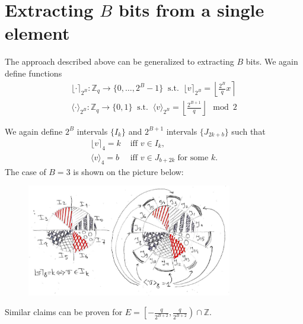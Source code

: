 \documentclass[12pt]{article}
\newcommand{\Z}{\mathbb{Z}}
\begin{document}
\section{Extracting $B$ bits from a single element}
\label{sec:Bbits}
The approach described above can be generalized to extracting $B$ bits.
We again define functions
\begin{align*}
\lfloor \cdot \rceil_{2^B}: \Z_q \rightarrow \{0, \ldots, 2^B - 1\}\;\;\text{s.t.}\;\; \lfloor v \rceil_{2^B} = \left\lfloor \frac{2^B}{q} x\right\rceil\\
\langle \cdot \rangle_{2^B}: \Z_q \rightarrow \{0, 1\}\;\;\text{s.t.}\;\; \langle v \rangle_{2^B} = \left\lfloor \frac{2^{B+1}}{q} \right\rfloor \mod 2
\end{align*}

We again define $2^B$ intervals $\{I_k\}$ and $2^{B + 1}$ intervals $\{J_{2k + b}\}$ such that
\begin{align*}
\lfloor v \rceil_4 = k&\text{ iff }v \in I_k,\\
\langle v \rangle_4 = b&\text{ iff }v \in J_{b + 2k}\;\text{for some }k.
\end{align*}
The case of $B = 3$ is shown on the picture below:
\begin{figure}[H]
    \centering
    \includegraphics[width=0.8\textwidth]{3bits_pic.jpg}
\end{figure}

Similar claims can be proven for $E = \left[-\frac{q}{2^{B+2}}, \frac{q}{2^{B+2}}\right) \cap \Z$.
\end{document}
